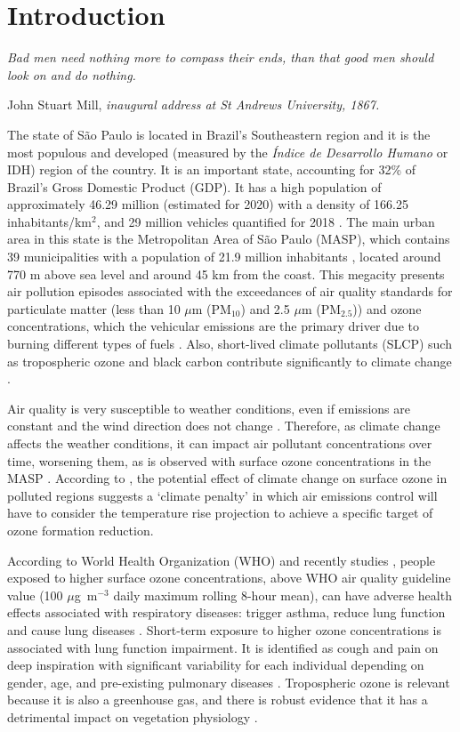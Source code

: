 \chapter{\bf Introduction}\label{chap:intro}
\epigraph{\textit{Bad men need nothing more to compass their ends, than that good men should look on and do nothing.}}{John Stuart Mill, \textit{inaugural address at St Andrews University, 1867.}}

\noindent The state of S\~{a}o Paulo is located in Brazil's Southeastern region and it is the most populous and developed (measured by the \textit{Índice de Desarrollo Humano} or IDH) region of the country.
It is an important state, accounting for 32\% of Brazil's Gross Domestic Product (GDP).
It has a high population of approximately 46.29 million (estimated for 2020) with a density of 166.25 inhabitants/km$^2$, and 29 million vehicles quantified for 2018 \citep[Brazilian Institute of Geography and Statistics,][]{IBGE2020}.  
The main urban area in this state is the Metropolitan Area of S\~{a}o Paulo (MASP), which contains 39 municipalities with a population of 21.9 million inhabitants \citep{IBGE2020b}, located around 770 m above sea level and around 45 km from the coast.
This megacity presents air pollution episodes associated with the exceedances of air quality standards for particulate matter (less than 10 $\mu$m (PM$_{10}$) and 2.5 $\mu$m (PM$_{2.5}$)) and ozone concentrations, which the vehicular emissions are the primary driver due to burning different types of fuels \citep{CETESB2019a}.
Also, short-lived climate pollutants (SLCP) such as tropospheric ozone and black carbon contribute significantly to climate change \citep{Von2015}.

Air quality is very susceptible to weather conditions, even if emissions are constant and the wind direction does not change \citep{Visscher2013}. 
Therefore, as climate change affects the weather conditions, it can impact air pollutant concentrations over time, worsening them, as is observed with surface ozone concentrations in the MASP \citep{CETESB2019}.
According to \citet{IPCC2013}, the potential effect of climate change on surface ozone in polluted regions suggests a `climate penalty' in which air emissions control will have to consider the temperature rise projection to achieve a specific target of ozone formation reduction.

According to World Health Organization (WHO) and recently studies \citep{Nuvolone2018}, people exposed to higher surface ozone concentrations, above WHO air quality guideline value (100 $\mu$g~m$^{-3}$ daily maximum rolling 8-hour mean), can have adverse health effects associated with respiratory diseases: trigger asthma, reduce lung function and cause lung diseases \citep{WHO2006}. 
Short-term exposure to higher ozone concentrations is associated with lung function impairment. 
It is identified as cough and pain on deep inspiration with significant variability for each individual depending on gender, age, and pre-existing pulmonary diseases \citep{Nuvolone2018}.
Tropospheric ozone is relevant because it is also a greenhouse gas, and there is robust evidence that it has a detrimental impact on vegetation physiology \citep{IPCC2013, Von2015}.

